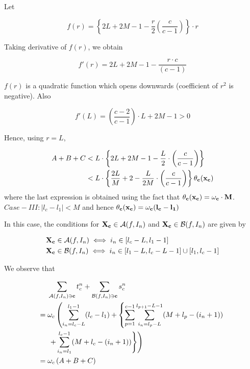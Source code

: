 \documentclass[10pt,letterpaper]{article}
\begin{document}
Let 

\begin{equation*}
	f(r) = \left\{2L + 2M - 1 - \frac{r}{2} \left(\frac{c}{c - 1}\right)\right\}\cdot r
\end{equation*}

Taking derivative of $f(r)$, we obtain

\begin{equation*}
	f'(r) = 2L + 2M - 1 - \frac{r \cdot c}{(c-1)} 
\end{equation*}

$f(r)$ is a quadratic function which opens downwards (coefficient of $r^2$ is negative). Also

\begin{equation*}
	f'(L) = \left(\frac{c - 2}{c - 1}\right) \cdot L + 2M - 1 > 0 
\end{equation*}

Hence, using $r = L$,

\begin{align}
A + B + C & < L \cdot \left\{2L + 2M - 1 - \frac{L}{2} \cdot \left( \frac{c}{c - 1} \right) \right\} \nonumber\\
			       & < L \cdot \left\{\frac{2L}{M} + 2 - \frac{L}{2M} \cdot \left( \frac{c}{c - 1} \right) \right\} \theta_{\bf c}(\bf{x_c}) \label{eq:case2bound}
\end{align}
where the last expression is obtained using the fact that $\theta_{\bf c}(\bf{x_c}) = \omega_c \cdot M$. \\


$Case - III: |l_c - l_1| < M$ and hence $\theta_{\bf c}(\bf{x_c}) = \omega_c(l_c - l_1)$

In this case, the conditions for ${\bf X_c} \in \mathcal{A}\mathit(f, I_n)$ and ${\bf X_c} \in \mathcal{B}\mathit(f, I_n)$ are given by

\begin{align*}
& {\bf X_c} \in \mathcal{A}\mathit(f, I_n) \iff i_n \in [l_c - L, l_1 - 1] \\
& {\bf X_c} \in \mathcal{B}\mathit(f, I_n) \iff i_n \in [l_1 - L, l_c - L - 1] \cup [l_1, l_c - 1]\\
\end{align*}

We observe that

\begin{align*}
	& \sum_{\mathcal{A}\mathit(f, I_n) \ni {\bf c}} t_c^n + \sum_{\mathcal{B}\mathit(f, I_n) \ni {\bf c}} s_c^n \\
	={}  & \omega_c \left( \sum_{i_n = l_c - L}^{l_1 - 1} (l_c - l_1) + \left\{ \sum_{p = 1}^{c-1} \sum_{i_n = l_p - L}^{l_{p+1}-L-1} (M + l_p - (i_n + 1)) \right.\right.\\ 
	     & \left. \left. + \sum_{i_n = l_1}^{l_c -1} (M + l_c - (i_n + 1)) \right\}\right)\\        
	={} & \omega_c \left( A + B + C \right) \\
\end{align*}
\end{document}
